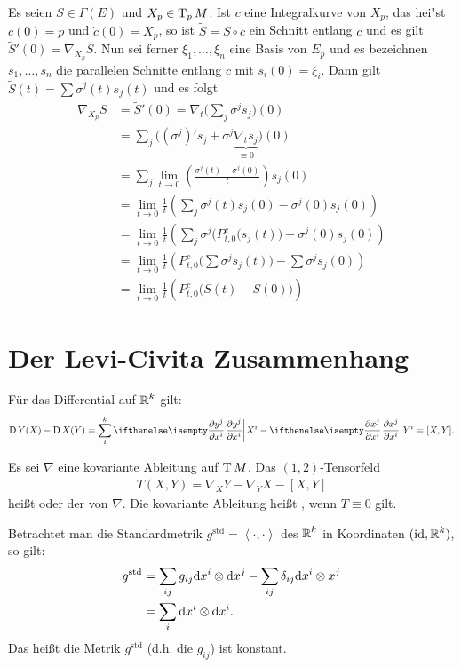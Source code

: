 Es seien $S \in \Gamma(E)$ und $X_p \in \operatorname{T}_pM$. Ist $c$ eine Integralkurve von $X_p$, das hei"st $c(0) = p$ und $\dot c(0) = X_p$, so ist $\tilde S = S \circ c$ ein Schnitt entlang $c$ und es gilt $\tilde S'(0) = \nabla_{X_p} S$. Nun sei ferner $\xi_1,\ldots ,\xi_n$ eine Basis von $E_p$ und es bezeichnen $s_1,\ldots ,s_n$ die parallelen Schnitte  entlang $c$ mit $s_i(0) = \xi_i$. Dann gilt $\tilde S(t) = \sum \sigma^j(t)s_j(t)$ und es folgt
\begin{align*}
	\nabla_{X_p}S &= \tilde S'(0) = \nabla_t \big( \sum_j \sigma^j s_j \big)(0)\\
	&= \sum_j \big( (\sigma^j)' s_j + \sigma^j \underbrace{\nabla_t s_j}_{\equiv 0} \big) (0)\\
	&= \sum_j \lim_{t \to 0} \left( \frac{\sigma^j(t) - \sigma^j(0)}{t} \right) s_j(0)\\
	&= \lim_{t \to 0} \frac{1}{t} \left( \sum_j \sigma^j(t) s_j(0) - \sigma^j(0) s_j(0) \right)\\
	&= \lim_{t \to 0} \frac{1}{t} \left( \sum_j \sigma^j \big(P_{t,0}^c (s_j(t) \big) - \sigma^j(0) s_j(0) \right)\\
	&= \lim_{t \to 0} \frac{1}{t} \left( P_{t,0}^c \big( \sum \sigma^j s_j(t) \big) - \sum \sigma^j s_j(0) \right)\\
	&= \lim_{t \to 0} \frac{1}{t} \left( P_{t,0}^c \big( \tilde S(t) - \tilde S(0) \big) \right)
\end{align*}



\section{Der Levi-Civita Zusammenhang}

Für das  Differential auf $\operatorname{\mathbb{R}}^k$ gilt:
\begin{align*}
  \D Y(X) - \D X(Y) = \sum_i^k\pdifffrac{y^j}{x^i}X^i - \pdifffrac{x^j}{x^i}Y^i = [X,Y].
\end{align*}

\begin{Dfn}
  Es sei $\nabla$ eine kovariante Ableitung auf $\operatorname{T} M$. Das $(1,2)$-Tensorfeld
  \begin{align*}
    T(X,Y) = \nabla_XY - \nabla_YX - [X,Y]
  \end{align*}
heißt  oder der  von $\nabla$.
Die kovariante Ableitung heißt , wenn $T \equiv 0$ gilt.

Betrachtet man die Standardmetrik $g^{\text{std}} = \left<\cdot,\cdot\right>$ des $\operatorname{\mathbb{R}}^k$ in Koordinaten $(\operatorname{id}, \operatorname{\mathbb{R}}^k)$, so gilt:
\begin{align*}
  g^{\text{std}} & = \sum_{ij} g_{ij} \mathrm{d} x^i \otimes \mathrm{d} x^j - \sum_{ij} \delta_{ij} \mathrm{d} x^i \otimes x^j\\
  & = \sum_i \mathrm{d} x^i \otimes \mathrm{d} x^i.
\end{align*}
Das heißt die Metrik $g^{\text{std}}$ (d.h. die $g_{ij}$) ist konstant.
\end{Dfn}


